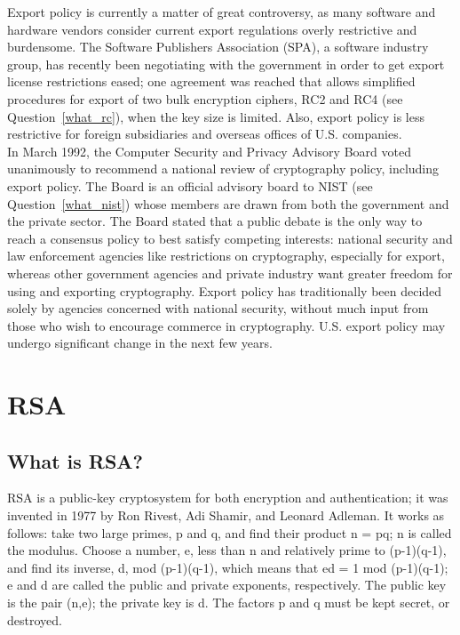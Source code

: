 Export policy is currently a matter of great controversy, as many software
and hardware vendors consider current export regulations overly restrictive
and burdensome. The Software Publishers Association (SPA), a software
industry group, has recently been negotiating with the government in order
to get export license restrictions eased; one agreement was reached that
allows simplified procedures for export of two bulk encryption ciphers, RC2
and RC4 (see Question~\ref{what_rc}), when the key size is limited. Also,
export policy is less restrictive for foreign subsidiaries and overseas
offices of U.S. companies.\\

In March 1992, the Computer Security and Privacy Advisory Board voted
unanimously to recommend a national review of cryptography policy,
including export policy. The Board is an official advisory board to NIST
(see Question~\ref{what_nist}) whose members are drawn from both the
government and the private sector. The Board stated that a public debate is
the only way to reach a consensus policy to best satisfy competing
interests: national security and law enforcement agencies like restrictions
on cryptography, especially for export, whereas other government agencies
and private industry want greater freedom for using and exporting
cryptography. Export policy has traditionally been decided solely by
agencies concerned with national security, without much input from those
who wish to encourage commerce in cryptography.  U.S. export policy may
undergo significant change in the next few years.

\section{RSA}

\subsection{What is RSA?}
\label{what_rsa}

RSA is a public-key cryptosystem for both encryption and
authentication; it was invented in 1977 by Ron Rivest, Adi Shamir, and
Leonard Adleman. It works as follows: take two large primes, p and q,
and find their product n = pq; n is called the modulus. Choose a
number, e, less than n and relatively prime to (p-1)(q-1), and find its
inverse, d, mod (p-1)(q-1), which means that ed = 1 mod (p-1)(q-1); e
and d are called the public and private exponents, respectively. The
public key is the pair (n,e); the private key is d. The factors p and q
must be kept secret, or destroyed.\\

